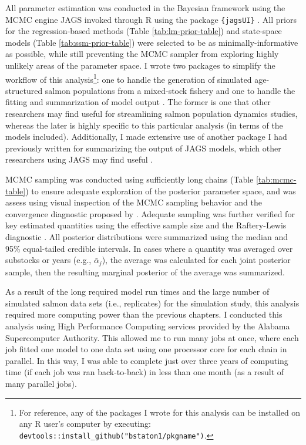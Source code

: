 \documentclass[12pt,]{book}
\let\rmarkdownfootnote\footnote%
\def\footnote{\protect\rmarkdownfootnote}
\theoremstyle{definition}
\theoremstyle{definition}
\theoremstyle{definition}
\theoremstyle{remark}
\begin{document}
\noindent
All parameter estimation was conducted in the Bayesian framework using
the MCMC engine JAGS \citep{plummer-2017} invoked through R
\citep{r-cite} using the package \texttt{\{jagsUI\}} \citep{r-jagsUI}.
All priors for the regression-based methods (Table
\ref{tab:lm-prior-table}) and state-space models (Table
\ref{tab:ssm-prior-table}) were selected to be as minimally-informative
as possible, while still preventing the MCMC sampler from exploring
highly unlikely areas of the parameter space. I wrote two packages to
simplify the workflow of this analysis\footnote{For reference, any of
  the packages I wrote for this analysis can be installed on any R
  user's computer by executing:
  \texttt{devtools::install\_github("bstaton1/pkgname")}.}: one to
handle the generation of simulated age-structured salmon populations
from a mixed-stock fishery \citep[\texttt{\{SimSR\}};][]{r-SimSR} and
one to handle the fitting and summarization of model output
\citep[\texttt{\{FitSR\}};][]{r-FitSR}. The former is one that other
researchers may find useful for streamlining salmon population dynamics
studies, whereas the later is highly specific to this particular
analysis (in terms of the models included). Additionally, I made
extensive use of another package I had previously written for
summarizing the output of JAGS models, which other researchers using
JAGS may find useful \citep[\texttt{\{codaTools\}};][]{r-codaTools}.

MCMC sampling was conducted using sufficiently long chains (Table
\ref{tab:mcmc-table}) to ensure adequate exploration of the posterior
parameter space, and was assess using visual inspection of the MCMC
sampling behavior and the convergence diagnostic proposed by
\citet{brooks-gelman-1998}. Adequate sampling was further verified for
key estimated quantities using the effective sample size and the
Raftery-Lewis diagnostic \citep{raftery-lewis-1992}. All posterior
distributions were summarized using the median and 95\% equal-tailed
credible intervals. In cases where a quantity was averaged over
substocks or years (e.g., \(\bar{\alpha}_j\)), the average was
calculated for each joint posterior sample, then the resulting marginal
posterior of the average was summarized.

As a result of the long required model run times and the large number of
simulated salmon data sets (i.e., replicates) for the simulation study,
this analysis required more computing power than the previous chapters.
I conducted this analysis using High Performance Computing services
provided by the Alabama Supercomputer Authority. This allowed me to run
many jobs at once, where each job fitted one model to one data set using
one processor core for each chain in parallel. In this way, I was able
to complete just over three years of computing time (if each job was ran
back-to-back) in less than one month (as a result of many parallel
jobs).
\end{document}
